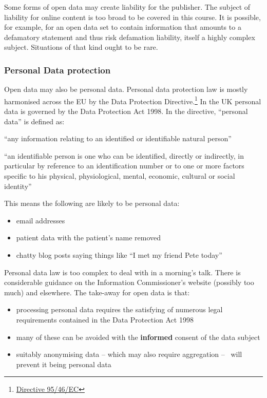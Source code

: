 Some forms of open data may create liability for the publisher. The
subject of liability for online content is too broad to be covered in
this course. It is possible, for example, for an open data set to
contain information that amounts to a defamatory statement and thus risk
defamation liability, itself a highly complex subject. Situations of
that kind ought to be rare.

\subsubsection{Personal Data protection}\label{personal-data-protection}

Open data may also be personal data. Personal data protection law is
mostly harmonised across the EU by the Data Protection
Directive.\footnote{\href{http://eur-lex.europa.eu/LexUriServ/LexUriServ.do?uri=CELEX:31995L0046:EN:HTML}{Directive
  95/46/EC}} In the UK personal data is governed by the Data Protection
Act 1998. In the directive, ``personal data'' is defined as:

``any information relating to an identified or identifiable natural
person''

``an identifiable person is one who can be identified, directly or
indirectly, in particular by reference to an identification number or to
one or more factors specific to his physical, physiological, mental,
economic, cultural or social identity''

This means the following are likely to be personal data:

\begin{itemize}
\item
  email addresses
\item
  patient data with the patient's name removed
\item
  chatty blog posts saying things like ``I met my friend Pete today''
\end{itemize}

Personal data law is too complex to deal with in a morning's talk. There
is considerable guidance on the Information Commissioner's website
(possibly too much) and elsewhere. The take-away for open data is that:

\begin{itemize}
\item
  processing personal data requires the satisfying of numerous legal
  requirements contained in the Data Protection Act 1998
\item
  many of these can be avoided with the \textbf{informed} consent of the
  data subject
\item
  suitably anonymising data -- which may also require aggregation --~
  will prevent it being personal data
\end{itemize}

